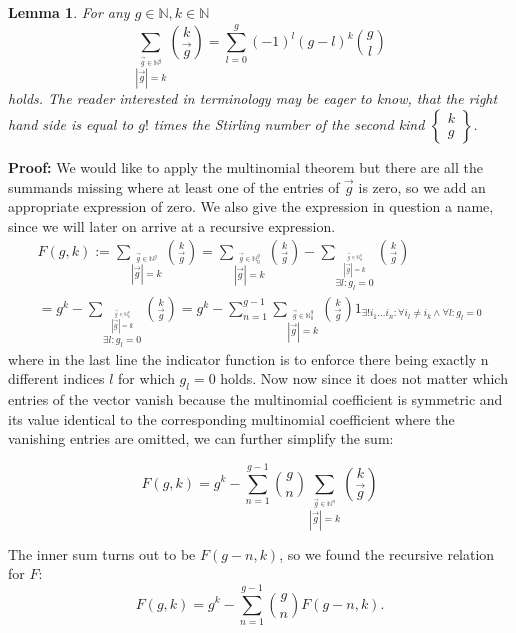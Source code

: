 \documentclass[b5paper,draft,openbib,12pt]{memoir}
\newtheorem{Lemma}[Def]{Lemma}
\begin{document}
\begin{Lemma}\label{stirling lemma}
For any \(g\in\mathbb{N},k\in\mathbb{N}\)
\begin{equation}
\sum_{\stackrel{\vec{g}\in\mathbb{N}^g}{|\vec{g}|=k}} \binom{k}{\vec{g}}=\sum_{l=0}^g (-1)^l (g-l)^k \binom{g}{l}
\end{equation}
holds. The reader interested in terminology may be eager to know, that the right hand side is equal to
 \(g!\) times the Stirling 
number of the second kind \(\left\{\begin{matrix}k\\g\end{matrix}\right\}\).
\end{Lemma}
\textbf{Proof:} We would like to apply the multinomial theorem but there are all the summands missing where at least
one of the entries of \(\vec{g}\) is zero, so we add an appropriate expression of zero. We also give the expression in
question a name, since we will later on arrive at a recursive expression.
\begin{multline}
F(g,k):=\sum_{\stackrel{\vec{g}\in\mathbb{N}^g}{|\vec{g}|=k}} \binom{k}{\vec{g}}
= \sum_{\stackrel{\vec{g}\in\mathbb{N}_0^g}{|\vec{g}|=k}} \binom{k}{\vec{g}}
- \sum_{\stackrel{\stackrel{\vec{g}\in\mathbb{N}_0^g}{|\vec{g}|=k}}{\exists l: g_l=0}} \binom{k}{\vec{g}}\\
= g^k 
 - \sum_{\stackrel{\stackrel{\vec{g}\in\mathbb{N}_0^g}{|\vec{g}|=k}}{\exists l: g_l=0}} \binom{k}{\vec{g}}
=g^k 
- \sum_{n=1}^{g-1} \sum_{\stackrel{\vec{g}\in\mathbb{N}_0^g}{|\vec{g}|=k}}
 \binom{k}{\vec{g}} 1_{\exists! i_1\dots i_n : \forall i_l\neq i_k \wedge \forall l :g_l=0}
\end{multline}
where in the last line the indicator function is to enforce there being exactly n different indices \(l\) for which \(g_l=0\)
holds. Now now since it does not matter which entries of the vector vanish because the multinomial coefficient 
is symmetric and its value identical to the corresponding multinomial coefficient where the vanishing entries
are omitted, we can further simplify the sum:

\begin{equation*}
F(g,k)= g^k -  \sum_{n=1}^{g-1} \binom{g}{n} \sum_{\stackrel{\vec{g}\in\mathbb{N}^n}{|\vec{g}|=k}}
 \binom{k}{\vec{g}}
\end{equation*}

The inner sum turns out to be \(F(g-n,k)\), so we found the recursive relation for \(F\):
\begin{equation}\label{combinatorics solution recursive}
F(g,k)= g^k -  \sum_{n=1}^{g-1} \binom{g}{n} F(g-n,k).
\end{equation}
\end{document}
